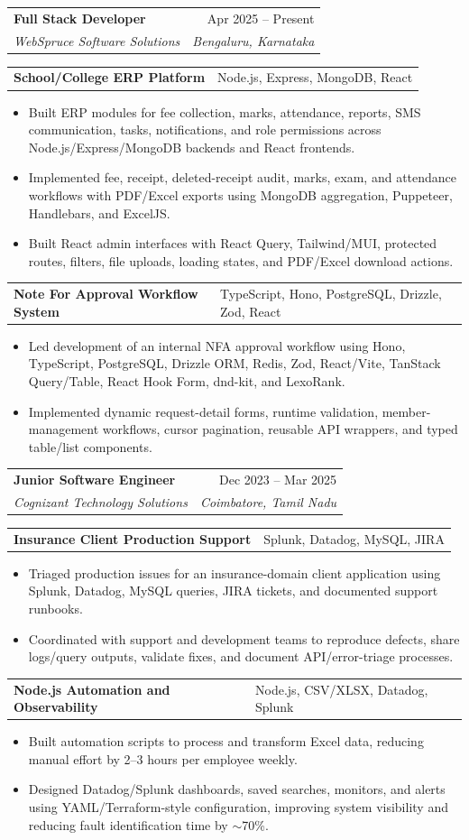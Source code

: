 \documentclass[a4paper,11pt]{article}
\makeatletter
\newcommand{\resumeItem}[1]{
	\item\small{
		{#1 \vspace{-2pt}}
	}
}
\newcommand{\resumeSubheading}[4]{
	\vspace{-2pt}\item
	\begin{tabular*}{0.97\textwidth}[t]{l@{\extracolsep{\fill}}r}
		\textbf{#1} & #2 \\
		\textit{\small#3} & \textit{\small #4} \\
	\end{tabular*}\vspace{-7pt}
}
\newcommand{\resumeSubSubheading}[2]{
	\item
	\begin{tabular*}{0.97\textwidth}{l@{\extracolsep{\fill}}r}
		\textit{\small#1} & \textit{\small #2} \\
	\end{tabular*}\vspace{-7pt}
}
\newcommand{\resumeExperienceProject}[2]{
    \item[]
    \begin{tabular*}{0.97\textwidth}{@{}p{0.50\textwidth}@{\extracolsep{\fill}}>{\raggedleft\arraybackslash}p{0.42\textwidth}@{}}
      \small\textbf{#1} & \small #2 \\
    \end{tabular*}\vspace{-7pt}
}
\newcommand{\resumeSubHeadingListEnd}{\end{list}}
\newcommand{\resumeItemListStart}{\begin{itemize}\setlength{\itemsep}{0pt}\setlength{\parsep}{0pt}\setlength{\topsep}{1pt}}
\newcommand{\resumeItemListEnd}{\end{itemize}\vspace{-3pt}}
\makeatother
\begin{document}
	\resumeSubheading
	{Full Stack Developer}{\hfill Apr 2025 -- Present}
	{WebSpruce Software Solutions}{Bengaluru, Karnataka}
	\resumeExperienceProject
	{School/College ERP Platform}{Node.js, Express, MongoDB, React}
	\resumeItemListStart
	\resumeItem{Built ERP modules for fee collection, marks, attendance, reports, SMS communication, tasks, notifications, and role permissions across Node.js/Express/MongoDB backends and React frontends.}
	\resumeItem{Implemented fee, receipt, deleted-receipt audit, marks, exam, and attendance workflows with PDF/Excel exports using MongoDB aggregation, Puppeteer, Handlebars, and ExcelJS.}
	\resumeItem{Built React admin interfaces with React Query, Tailwind/MUI, protected routes, filters, file uploads, loading states, and PDF/Excel download actions.}
	\resumeItemListEnd
	\resumeExperienceProject
	{Note For Approval Workflow System}{TypeScript, Hono, PostgreSQL, Drizzle, Zod, React}
	\resumeItemListStart
	\resumeItem{Led development of an internal NFA approval workflow using Hono, TypeScript, PostgreSQL, Drizzle ORM, Redis, Zod, React/Vite, TanStack Query/Table, React Hook Form, dnd-kit, and LexoRank.}
	\resumeItem{Implemented dynamic request-detail forms, runtime validation, member-management workflows, cursor pagination, reusable API wrappers, and typed table/list components.}
	\resumeItemListEnd
	
	
	\resumeSubheading
	{Junior Software Engineer}{\hfill Dec 2023 -- Mar 2025}
	{Cognizant Technology Solutions}{Coimbatore, Tamil Nadu}
	\resumeExperienceProject
	{Insurance Client Production Support}{Splunk, Datadog, MySQL, JIRA}
	\resumeItemListStart
	\resumeItem{Triaged production issues for an insurance-domain client application using Splunk, Datadog, MySQL queries, JIRA tickets, and documented support runbooks.}
	\resumeItem{Coordinated with support and development teams to reproduce defects, share logs/query outputs, validate fixes, and document API/error-triage processes.}
	\resumeItemListEnd
	\resumeExperienceProject
	{Node.js Automation and Observability}{Node.js, CSV/XLSX, Datadog, Splunk}
	\resumeItemListStart
	\resumeItem{Built automation scripts to process and transform Excel data, reducing manual effort by 2--3 hours per employee weekly.}
	\resumeItem{Designed Datadog/Splunk dashboards, saved searches, monitors, and alerts using YAML/Terraform-style configuration, improving system visibility and reducing fault identification time by $\sim$70\%.}
	\resumeItemListEnd
	
\end{document}

